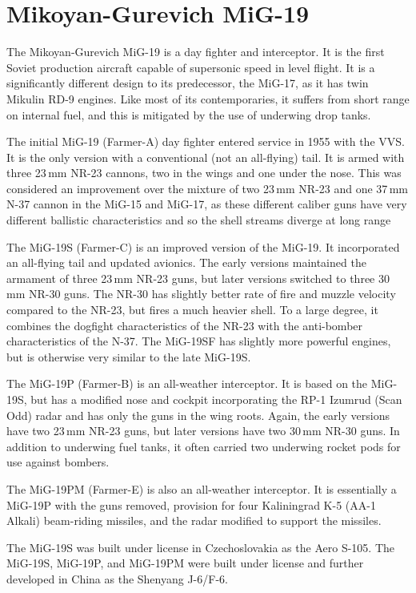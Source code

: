 \section*{Mikoyan-Gurevich MiG-19}

The Mikoyan-Gurevich MiG-19 is a day fighter and interceptor. It is the first Soviet production aircraft capable of supersonic speed in level flight. It is a significantly different design to its predecessor, the MiG-17, as it has twin Mikulin RD-9 engines. Like most of its contemporaries, it suffers from short range on internal fuel, and this is mitigated by the use of underwing drop tanks.

The initial MiG-19 (Farmer-A) day fighter entered service in 1955 with the VVS. It is the only version with a conventional (not an all-flying) tail. It is armed with three 23\,mm NR-23 cannons, two in the wings and one under the nose. This was considered an improvement over the mixture of two 23\,mm NR-23 and one 37\,mm N-37 cannon in the MiG-15 and MiG-17, as these different caliber guns have very different ballistic characteristics and so the shell streams diverge at long range

The MiG-19S (Farmer-C) is an improved version of the MiG-19. It incorporated an all-flying tail and updated avionics. The early versions maintained the armament of three 23\,mm NR-23 guns, but later versions switched to three 30\,mm NR-30 guns. The NR-30 has slightly better rate of fire and muzzle velocity compared to the NR-23, but fires a much heavier shell. To a large degree, it combines the dogfight characteristics of the NR-23 with the anti-bomber characteristics of the N-37. The MiG-19SF has slightly more powerful engines, but is otherwise very similar to the late MiG-19S.

The MiG-19P (Farmer-B) is an all-weather interceptor. It is based on the MiG-19S, but has a modified nose and cockpit incorporating the RP-1 Izumrud (Scan Odd) radar and has only the guns in the wing roots. Again, the early versions have two 23\,mm NR-23 guns, but later versions have two 30\,mm NR-30 guns. In addition to underwing fuel tanks, it often carried two underwing rocket pods for use against bombers.

The MiG-19PM (Farmer-E) is also an all-weather interceptor. It is essentially a MiG-19P with the guns removed, provision for four Kaliningrad K-5 (AA-1 Alkali) beam-riding missiles, and the radar modified to support the missiles.

The MiG-19S was built under license in Czechoslovakia as the Aero S-105. The MiG-19S, MiG-19P, and MiG-19PM were built under license and further developed in China as the Shenyang J-6/F-6.

